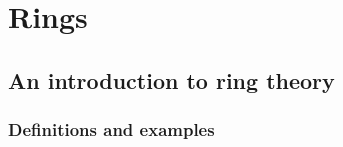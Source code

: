 \documentclass[12pt]{report}
\numberwithin{equation}{section}
\numberwithin{theorem}{chapter}
\theoremstyle{definition}
\newtheorem{example}[theorem]{Example}
\newtheorem*{basic properties}{Basic Properties}
\newtheorem*{Important Remark}{Important Remark}
\def\sdp{\rtimes}
\begin{document}
\begin{comment}
We can now use semidirect products to construct nonabelian groups. First, here is one more useful fact about automorphism groups.



\begin{example}
	Let us construct an explicit nonabelian group of order $63 = 3^2 \cdot 7$.   
Consider $H = \mathbb{Z}/7$ and $K = \mathbb{Z}/9$. If we can find a nontrivial homomorphism $\rho\!: \mathbb{Z}/9 \to \mathrm{Aut}(\mathbb{Z}/7)$, then by $\Cref{semidirect product nonabliean}$ the semidirect product $H \sdp_{\rho} K$ is not abelian.

By \Cref{aut Cp cyclic of order p-1},
$$\mathrm{Aut}(\mathbb{Z}/7) \cong \mathbb{Z}/6.$$
Since $\mathbb{Z}/9$ is a cyclic group, the \hyperref[UMP for cyclic groups]{UMP for cyclic groups} says that to any homomorphism $\rho\!: \mathbb{Z}/9 \to \mathbb{Z}/6$ is completely determined by $\alpha = \rho([1]_9)$, and that any $\alpha \in \mathbb{Z}/6$ such that $9\alpha = 0$ gives rise to such a homomorphism. Thus setting $\alpha = [2]_6$ gives us the homomorphism $\rho\!: \mathbb{Z}/9 \to \mathbb{Z}/6$ with
$$\rho([i]_9) = [2i].$$
Moreover, $\rho$ is nontrivial, since 
$$\rho([1]_9) = [2]_6 \neq [0]_6.$$
We conclude that
$$\mathbb{Z}/7 \sdp_{\rho} \mathbb{Z}/9$$
is a nonabelian group. In fact, we can give a presentation for $\rho$. 
\end{example}


\end{comment}





\part{Rings}

\chapter{An introduction to ring theory}


\section{Definitions and examples}
\end{document}
